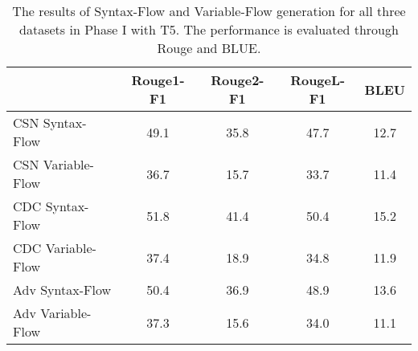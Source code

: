\documentclass[11pt]{article}
\begin{document}
\begin{table*}[ht]
\centering
\begin{tabular}{|l|c|c|c|c|}
\hline
                 & Rouge1-F1                    & Rouge2-F1                   & RougeL-F1   & BLEU  \\ \hline
CSN Syntax-Flow   & 49.1                      & 35.8                          & 47.7    & 12.7 \\ 
CSN Variable-Flow & 36.7                        & 15.7                        & 33.7    & 11.4 \\ \hline
CDC Syntax-Flow   & 51.8                       & 41.4                         & 50.4    & 15.2 \\ 
CDC Variable-Flow & 37.4                        & 18.9                        & 34.8    & 11.9 \\ \hline
Adv Syntax-Flow   & 50.4                        & 36.9                        & 48.9    & 13.6 \\ 
Adv Variable-Flow & 37.3                        & 15.6                        & 34.0    & 11.1 \\ \hline  
\end{tabular}
\caption{The results of Syntax-Flow and Variable-Flow generation for all three datasets in Phase I with T5. The performance is evaluated through Rouge and BLUE.}
\label{table::phase1}
\end{table*}
\end{document}
